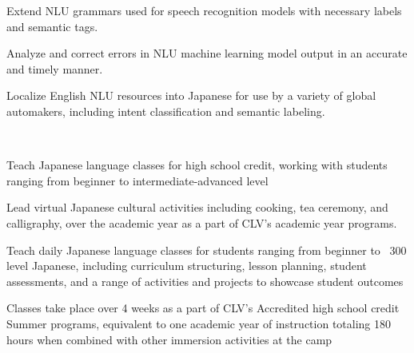 \documentclass[letterpaper]{deedy-resume_sm} %
\begin{document}
\sectionspace %
\begin{tightitemize}
\item Extend NLU grammars used for speech recognition models with necessary labels and semantic tags.
\item Analyze and correct errors in NLU machine learning model output in an accurate and timely manner.
\item Localize English NLU resources into Japanese for use by a variety of global automakers, including intent classification and semantic labeling.   
\end{tightitemize}
\sectionspace %
\\
\begin{tightitemize}
\item Teach Japanese language classes for high school credit, working with students ranging from beginner to intermediate-advanced level
\item Lead virtual Japanese cultural activities including cooking, tea ceremony, and calligraphy, over the academic year as a part of CLV's academic year programs.
\end{tightitemize}
\begin{tightitemize}
\item Teach daily Japanese language classes for students ranging from beginner to ~300 level Japanese, including curriculum structuring, lesson planning, student assessments, and a range of activities and projects to showcase student outcomes
\item Classes take place over 4 weeks as a part of CLV's Accredited high school credit Summer programs, equivalent to one academic year of instruction totaling 180 hours when combined with other immersion activities at the camp
\end{tightitemize}
\end{document}
